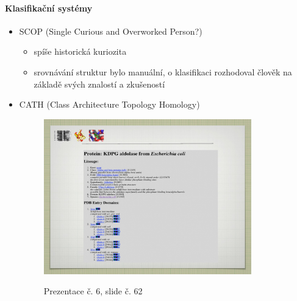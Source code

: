 \documentclass[DIV=8]{scrreprt}
\begin{document}
\paragraph{Klasifikační systémy}
\begin{itemize}[nosep]
    \item SCOP (Single Curious and Overworked Person?)
\begin{itemize}[nosep]
    \item spíše historická kuriozita
    \item srovnávání struktur bylo manuální, o klasifikaci rozhodoval člověk na základě svých znalostí a zkušeností
\end{itemize}

    \item CATH (Class Architecture Topology Homology) \begin{figure}
    \caption{Prezentace č. 6, slide č. 62}
    \includegraphics[width=0.85\textwidth]{slides-6/slide-62.jpg}
    \centering
    \label{slides-6-slide-62}
\end{figure}


\end{itemize}
\end{document}
